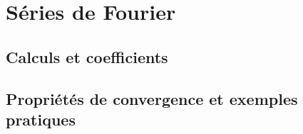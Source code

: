 \chapter{Séries de Fourier}\label{fourier}
\section{Calculs et coefficients}\label{fourier:calc}
\section{Propriétés de convergence et exemples pratiques}\label{fourier:conv}
